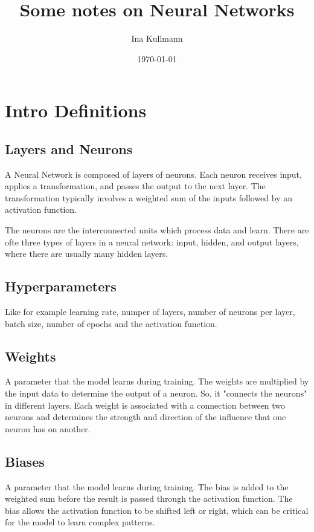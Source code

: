 \documentclass{article}
\begin{document}
\title{Some notes on Neural Networks}
\author{Ina Kullmann}
\date{\today}  %

\maketitle  %

\section{Intro Definitions}
    
\subsection*{Layers and Neurons}
A Neural Network is composed of layers of neurons. Each neuron receives input, applies a transformation, and passes the output to the next layer. The transformation typically involves a weighted sum of the inputs followed by an activation function.

The neurons are the interconnected units which process data and learn. 
There are ofte three types of layers in a neural network: input, hidden, and output layers, where there are usually many hidden layers. 

\subsection*{Hyperparameters}
Like for example learning rate, numper of layers, number of neurons per layer, batch size, number of epochs and the activation function. 

\subsection*{Weights}
A parameter that the model learns during training. The weights are multiplied by the input data to determine the output of a neuron. 
So, it "connects the neurons" in different layers. Each weight is associated with a connection between two neurons and determines the strength and direction of the influence that one neuron has on another. 

\subsection*{Biases}
A parameter that the model learns during training. The bias is added to the weighted sum before the result is passed through the activation function. The bias allows the activation function to be shifted left or right, which can be critical for the model to learn complex patterns. 
\end{document}
